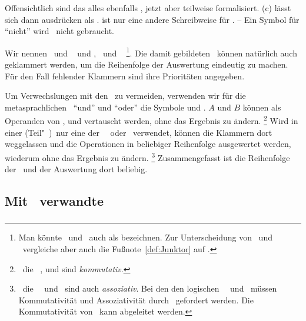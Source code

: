 Offensichtlich sind das alles ebenfalls \Aussagen, jetzt aber teilweise formalisiert.
(c) lässt sich dann ausdrücken als .
 ist nur eine andere Schreibweise für .
-- Ein Symbol für "`nicht"' wird \hier\ nicht gebraucht.

Wir nennen \MtsAnd\ und \MtsOr\  und \MtsImp, \MtsRep\ und \MtsEquiv\ %
\footnote{%
	Man könnte \Metaoperationen\ und \Metarelationen\ auch als  bezeichnen. Zur Unterscheidung von \Operationen\ und \Relationen\ vergleiche aber auch die Fußnote~\ref{def:Junktor} auf .
}.
Die damit gebildeten \Aussagen\ können natürlich auch geklammert werden, um die Reihenfolge der Auswertung eindeutig zu machen.
Für den Fall fehlender Klammern sind ihre Prioritäten  angegeben.

Um Verwechslungen mit den \Junktoren\ zu vermeiden, verwenden wir für die metasprachlichen \Operationen\ "`und"' und "`oder"' die Symbole \chrqt{\MtsAnd} und \chrqt{\MtsOr}.
$A$ und $B$ können als Operanden von \chrqt{\MtsEquiv}, \chrqt{\MtsAnd} und \chrqt{\MtsOr} vertauscht werden, ohne das Ergebnis zu ändern.%
\footnote{%
	\textDh\ die \Operationen\ \chrqt{\MtsEquiv}, \chrqt{\MtsAnd} und \chrqt{\MtsOr} sind \emph{kommutativ}.
}
Wird in einer (Teil"~)\Aussage\ nur eine der \Operationen\ \MtsAnd\ oder \MtsOr\ verwendet, können die Klammern dort weggelassen und die Operationen in beliebiger Reihenfolge ausgewertet werden, wiederum ohne das Ergebnis zu ändern.%
\footnote{%
	\textDh\ die \Operationen\ \MtsAnd\ und \MtsOr\ sind auch \emph{assoziativ}.
	Bei den den logischen \Operationen\ \OjkAnd\ und \OjkOr\ müssen Kommutativität und Assoziativität durch \Axiome\ gefordert werden.
	Die Kommutativität von \MtsEquiv\ kann abgeleitet werden.
}
Zusammengefasst ist die Reihenfolge der \Operationen\ und der Auswertung dort beliebig.

\subsection[Mit Gleichheit verwandte Relationen]{Mit \Gleichheit\ verwandte \Relationen}
\label     {sub:Gleichheit}

\subsubsection[Vergleichbar]{\Vergleichbar}%
\label {subsub:Vergleichbar}


